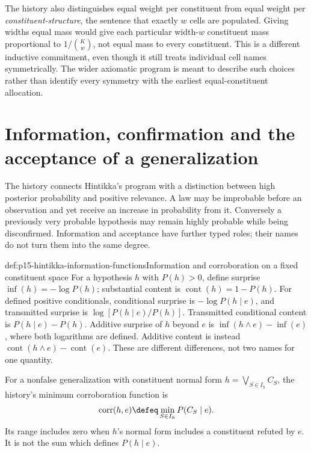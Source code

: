 The history also distinguishes equal weight per constituent from equal
weight per \emph{constituent-structure}, the sentence that exactly
\(w\) cells are populated. Giving widths equal mass would give each
particular width-\(w\) constituent mass proportional to
\(1/\binom Kw\), not equal mass to every constituent. This is a
different inductive commitment, even though it still treats individual
cell names symmetrically. The wider axiomatic program is meant to
describe such choices rather than identify every symmetry with the
earliest equal-constituent allocation.

\section{Information, confirmation and the acceptance of a generalization}
\label{sec:p15-hintikka-information-acceptance}

The history connects Hintikka's program with a distinction between high
posterior probability and positive relevance. A law may be improbable
before an observation and yet receive an increase in probability from
it. Conversely a previously very probable hypothesis may remain highly
probable while being disconfirmed. Information and acceptance have
further typed roles; their names do not turn them into the same degree.

\begin{hbdefinition}{def:p15-hintikka-information-functions}{Information and corroboration on a fixed constituent space}
For a hypothesis \(h\) with \(P(h)>0\), define surprise
\(\operatorname{inf}(h)=-\log P(h)\); substantial content is
\(\operatorname{cont}(h)=1-P(h)\). For defined positive
conditionals, conditional surprise is \(-\log P(h\mid e)\),
and transmitted surprise is
\(\log[P(h\mid e)/P(h)]\). Transmitted conditional content is
\(P(h\mid e)-P(h)\). Additive surprise of \(h\) beyond \(e\) is
\(\operatorname{inf}(h\land e)-\operatorname{inf}(e)\), where
both logarithms are defined. Additive content is instead
\(\operatorname{cont}(h\land e)-\operatorname{cont}(e)\).
These are different differences, not two names for one quantity.

For a nonfalse generalization with constituent normal form
\(h=\bigvee_{S\in I_h}C_S\), the history's minimum
corroboration function is
\[
 \operatorname{corr}(h,e)\defeq
               \min_{S\in I_h}P(C_S\mid e).
\]
Its range includes zero when \(h\)'s normal form includes a constituent
refuted by \(e\). It is not the sum which defines \(P(h\mid e)\).
\end{hbdefinition}


